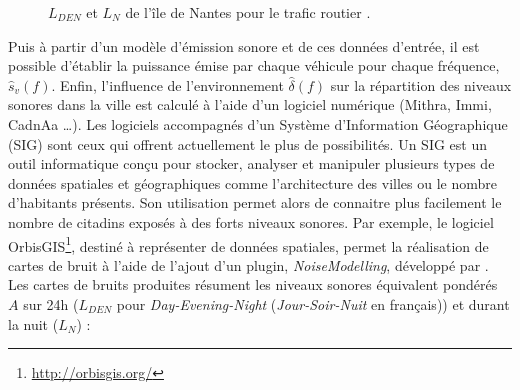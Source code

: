 \begin{figure}[t]
\centering
{}
\caption{$L_{DEN}$  et $L_N$  de l'île de Nantes pour le trafic routier \cite{nantes_carte}.}
\label{fig:carto_nantes}
\end{figure}

Puis à partir d'un modèle d'émission sonore et de ces données d'entrée, il est possible d'établir la puissance émise par chaque véhicule pour chaque fréquence, $\hat{s}_{v}(f)$.
Enfin, l'influence de l'environnement $\hat{\delta}(f)$ sur la répartition des niveaux sonores dans la ville est calculé à l'aide d'un logiciel numérique (Mithra, Immi, CadnAa \dots). Les logiciels accompagnés d'un Système d'Information Géographique (SIG) sont ceux qui offrent actuellement le plus de possibilités. Un SIG est un outil informatique conçu pour stocker, analyser et manipuler plusieurs types de données spatiales et géographiques comme l'architecture des villes ou le nombre d'habitants présents.
Son utilisation permet alors de connaitre plus facilement le nombre de citadins exposés à des forts niveaux sonores.
Par exemple, le logiciel OrbisGIS\footnote{\url{http://orbisgis.org/}}, destiné à représenter de données spatiales, permet la réalisation de cartes de bruit à l'aide de l'ajout d'un plugin, \textit{NoiseModelling}, développé par \cite{fortin}. \\

Les cartes de bruits produites résument les niveaux sonores équivalent pondérés $A$ sur 24h ($L_{DEN}$ pour \textit{Day-Evening-Night} (\textit{Jour-Soir-Nuit} en français)) et durant la nuit ($L_N$) :

